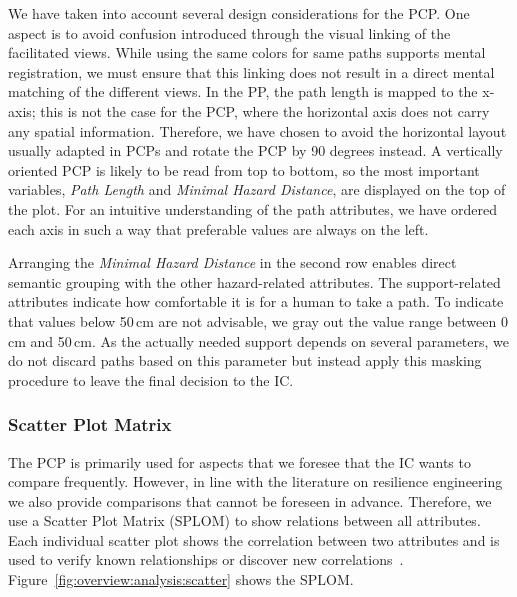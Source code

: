 \documentclass{egpubl}
\begin{document}
We have taken into account several design considerations for the PCP. One aspect is to avoid confusion introduced through the visual linking of the facilitated views. While using the same colors for same paths supports mental registration, we must ensure that this linking does not result in a direct mental matching of the different views. In the PP, the path length is mapped to the x-axis; this is not the case for the PCP, where the horizontal axis does not carry any spatial information. Therefore, we have chosen to avoid the horizontal layout usually adapted in PCPs and rotate the PCP by 90 degrees instead. A vertically oriented PCP is likely to be read from top to bottom, so the most important variables, \emph{Path Length} and \emph{Minimal Hazard Distance}, are displayed on the top of the plot. For an intuitive understanding of the path attributes, we have ordered each axis in such a way that preferable values are always on the left. 

Arranging the \emph{Minimal Hazard Distance} in the second row enables direct semantic grouping with the other hazard-related attributes. The support-related attributes indicate how comfortable it is for a human to take a path. To indicate that values below 50\,cm are not advisable, we gray out the value range between 0\,cm and 50\,cm. As the actually needed support depends on several parameters, we do not discard paths based on this parameter but instead apply this masking procedure to leave the final decision to the IC.

\subsubsection{Scatter Plot Matrix} \label{sec:overview:analysis:scatter}
The PCP is primarily used for aspects that we foresee that the IC wants to compare frequently. However, in line with the literature on resilience engineering~\cite{Lundberg2012} we also provide comparisons that cannot be foreseen in advance. Therefore, we use a Scatter Plot Matrix (SPLOM) to show relations between all attributes. Each individual scatter plot shows the correlation between two attributes and is used to verify known relationships or discover new correlations~\cite{Li2008}. Figure~\ref{fig:overview:analysis:scatter} shows the SPLOM.
\end{document}
